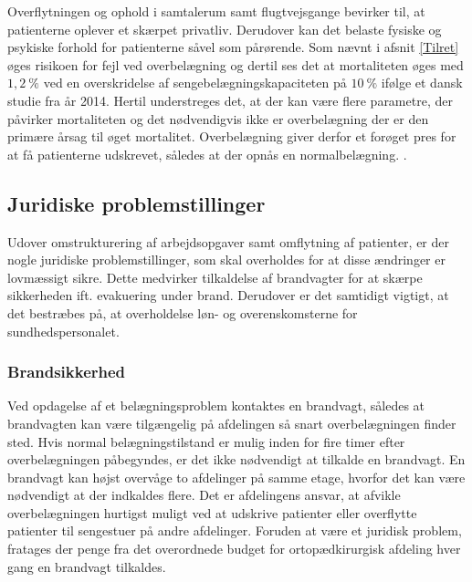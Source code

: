 \noindet
Overflytningen og ophold i samtalerum samt flugtvejsgange bevirker til, at patienterne oplever et skærpet privatliv. \cite{Madsen2014} Derudover kan det belaste fysiske og psykiske forhold for patienterne såvel som pårørende. \cite{Heidmann2014} Som nævnt i afsnit \ref{Tilret} øges risikoen for fejl ved overbelægning og dertil ses det at mortaliteten øges med $1,2~\%$ ved en overskridelse af sengebelægningskapaciteten på $10~\%$ ifølge et dansk studie fra år 2014. \cite{Madsen2014} Hertil understreges det, at der kan være flere parametre, der påvirker mortaliteten og det nødvendigvis ikke er overbelægning der er den primære årsag til øget mortalitet. Overbelægning giver derfor et forøget pres for at få patienterne udskrevet, således at der opnås en normalbelægning. .


\subsection{Juridiske problemstillinger}
Udover omstrukturering af arbejdsopgaver samt omflytning af patienter, er der nogle juridiske problemstillinger, som skal overholdes for at disse ændringer er lovmæssigt sikre. Dette medvirker tilkaldelse af brandvagter for at skærpe sikkerheden ift. evakuering under brand. Derudover er det samtidigt vigtigt, at det bestræbes på, at overholdelse løn- og overenskomsterne for sundhedspersonalet.

\subsubsection{Brandsikkerhed}
Ved opdagelse af et belægningsproblem kontaktes en brandvagt, således at brandvagten kan være tilgængelig på afdelingen så snart overbelægningen finder sted. Hvis normal belægningstilstand er mulig inden for fire timer efter overbelægningen påbegyndes, er det ikke nødvendigt at tilkalde en brandvagt. En brandvagt kan højst overvåge to afdelinger på samme etage, hvorfor det kan være nødvendigt at der indkaldes flere. Det er afdelingens ansvar, at afvikle overbelægningen hurtigst muligt ved at udskrive patienter eller overflytte patienter til sengestuer på andre afdelinger. \cite{Beredskab2016} Foruden at være et juridisk problem, fratages der penge fra det overordnede budget for ortopædkirurgisk afdeling hver gang en brandvagt tilkaldes.  

